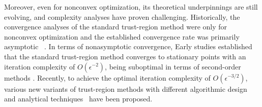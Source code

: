 \documentclass{article}
\begin{document}
Moreover, even for nonconvex optimization, its theoretical underpinnings are still evolving, and complexity analyses have proven challenging.
Historically, the convergence analyses of the standard trust-region method were only for nonconvex optimization and the established convergence rate was primarily asymptotic ~\cite{conn2000trust, yuan2015recent}. In terms of nonasymptotic convergence, Early studies established that the standard trust-region method \cite{nocedal1999numerical,conn2000trust,cartisComplexitySteepestDescent2010,cartisComplexityBoundsSecondorder2012} converges to stationary points with an iteration complexity of $O(\epsilon^{-2})$, being suboptimal in terms of second-order methods \cite{carmon2021lower}. Recently, to achieve the optimal iteration complexity of $O(\epsilon^{-3/2})$, various new variants of trust-region methods with different algorithmic design and analytical techniques~\cite{luenberger_linear_2021, curtis2017trust, curtis2021trust, hamad2022consistently, hamad2024simplepracticaladaptivetrustregion} have been proposed.
\end{document}
